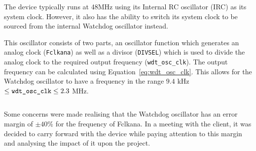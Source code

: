 The device typically runs at 48MHz using its Internal RC oscillator (IRC) as its system clock. However, it also has the ability to switch its system clock to be sourced from the internal Watchdog oscillator instead. 

This oscillator consists of two parts, an oscillator function which generates an analog clock (\verb|Fclkana|) as well as a divisor (\verb|DIVSEL|) which is used to divide the analog clock to the required output frequency (\verb|wdt_osc_clk|). The output frequency can be calculated using Equation~\ref{eq:wdt_osc_clk}. This allows for the Watchdog oscillator to have a frequency in the range $ 9.4 $ kHz $ \leq \verb|wdt_osc_clk| \leq 2.3 $ MHz. \cite{mbed_datasheet}

\begin{equation}
	\label{eq:wdt_osc_clk}
\end{equation}

Some concerns were made realising that the Watchdog oscillator has an error margin of $\pm 40\%$ for the frequency of Fclkana. In a meeting with the client, it was decided to carry forward with the device while paying attention to this margin and analysing the impact of it upon the project.

 

